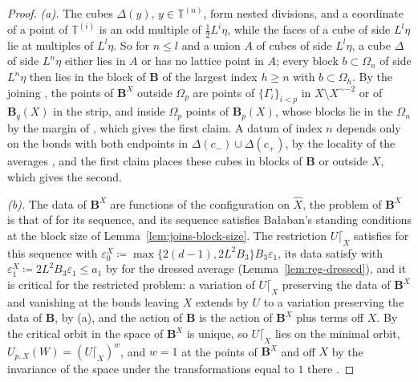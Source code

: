 \documentclass[11pt]{preprint}
\numberwithin{equation}{section}
\theoremstyle{definition}
\theoremstyle{remark}
\theoremstyle{plain}
\begin{document}
\begin{proof}
\emph{(a).} The cubes $\Delta(y)$, $y \in \mathbb T^{(n)}$, form nested divisions, and a coordinate of a point of $\mathbb T^{(i)}$ is an odd multiple of $\frac12L^i\eta$, while the faces of a cube of side $L^l\eta$ lie at multiples of $L^l\eta$. So for $n \leq l$ and a union $A$ of cubes of side $L^l\eta$, a cube $\Delta$ of side $L^n\eta$ either lies in $A$ or has no lattice point in $A$; every block $b \subset \Omega_n$ of side $L^n\eta$ then lies in the block of $\mathbf B$ of the largest index $h \geq n$ with $b \subset \Omega_h$. By the joining \cite[(2.14)]{BalabanCRE} \cite[p.~257, ll.~7--26]{BalabanCRE}, the points of $\mathbf B^X$ outside $\Omega_p$ are points of $\{\Gamma_i\}_{i<p}$ in $X \setminus X^{\sim-2}$ or of $\mathbf B_q(X)$ in the strip, and inside $\Omega_p$ points of $\mathbf B_p(X)$, whose blocks lie in the $\Omega_n$ by the margin of \cite[(2.14)]{BalabanCRE}, which gives the first claim. A datum of index $n$ depends only on the bonds with both endpoints in $\Delta(c_-) \cup \Delta(c_+)$, by the locality of the averages \cite[(0.4)]{BalabanRG1}, and the first claim places these cubes in blocks of $\mathbf B$ or outside $X$, which gives the second.

\emph{(b).} The data of $\mathbf B^X$ are functions of the configuration on $\hat X$, the problem of $\mathbf B^X$ is that of \cite[(5)--(6)]{BalabanVAR} for its sequence, and its sequence satisfies Ba{\l}aban's standing conditions at the block size of Lemma~\ref{lem:joins-block-size}. The restriction $U\lceil_X$ satisfies \cite[(2)]{BalabanVAR} for this sequence with $\varepsilon_0^X \coloneqq \max\{2(d - 1), 2L^2B_3\}B_3\varepsilon_1$, its data satisfy \cite[(7)]{BalabanVAR} with $\varepsilon_1^X \coloneqq 2L^2B_3\varepsilon_1 \leq a_1$ by \cite[Proposition~2]{BalabanAVG} for the dressed average (Lemma~\ref{lem:reg-dressed}), and it is critical for the restricted problem: a variation of $U\lceil_X$ preserving the data of $\mathbf B^X$ and vanishing at the bonds leaving $X$ extends by $U$ to a variation preserving the data of $\mathbf B$, by (a), and the action of $\mathbf B$ is the action of $\mathbf B^X$ plus terms off $X$. By \cite[Theorem~1]{BalabanVAR} the critical orbit in the space of $\mathbf B^X$ is unique, so $U\lceil_X$ lies on the minimal orbit, $U_{p,X}(W) = (U\lceil_X)^w$, and $w = 1$ at the points of $\mathbf B^X$ and off $X$ by the invariance of the space under the transformations equal to $1$ there \cite[p.~278, ll.~16--19, 32--33]{BalabanVAR}.


\end{proof}
\end{document}
